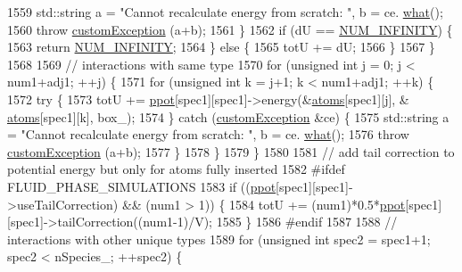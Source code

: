 \begin{DoxyCode}
1559                 std::string a = \textcolor{stringliteral}{"Cannot recalculate energy from scratch: "}, b = ce.
      \hyperlink{classcustom_exception_aeb6ab5848b038adfc68fde86a512f691}{what}();
1560                 \textcolor{keywordflow}{throw} \hyperlink{classcustom_exception}{customException} (a+b);
1561             \}
1562             \textcolor{keywordflow}{if} (dU == \hyperlink{potentials_8h_ab94ab1d09e2291d03fe92a0e24a9d33b}{NUM\_INFINITY}) \{
1563                 \textcolor{keywordflow}{return} \hyperlink{potentials_8h_ab94ab1d09e2291d03fe92a0e24a9d33b}{NUM\_INFINITY};
1564             \} \textcolor{keywordflow}{else} \{
1565                 totU += dU;
1566             \}
1567         \}
1568 
1569         \textcolor{comment}{// interactions with same type}
1570         \textcolor{keywordflow}{for} (\textcolor{keywordtype}{unsigned} \textcolor{keywordtype}{int} j = 0; j < num1+adj1; ++j) \{
1571             \textcolor{keywordflow}{for} (\textcolor{keywordtype}{unsigned} \textcolor{keywordtype}{int} k = j+1; k < num1+adj1; ++k) \{
1572                 \textcolor{keywordflow}{try} \{
1573                     totU += \hyperlink{classsim_system_ad2e290b5963f132e6a3a56cee35c8e9f}{ppot}[spec1][spec1]->energy(&\hyperlink{classsim_system_a90421b19082f7fb8fc23b7264b1161e4}{atoms}[spec1][j], &
      \hyperlink{classsim_system_a90421b19082f7fb8fc23b7264b1161e4}{atoms}[spec1][k], box\_);
1574                 \} \textcolor{keywordflow}{catch} (\hyperlink{classcustom_exception}{customException} &ce) \{
1575                     std::string a = \textcolor{stringliteral}{"Cannot recalculate energy from scratch: "}, b = ce.
      \hyperlink{classcustom_exception_aeb6ab5848b038adfc68fde86a512f691}{what}();
1576                     \textcolor{keywordflow}{throw} \hyperlink{classcustom_exception}{customException} (a+b);
1577                 \}
1578             \}
1579         \}
1580 
1581         \textcolor{comment}{// add tail correction to potential energy but only for atoms fully inserted}
1582 \textcolor{preprocessor}{#ifdef FLUID\_PHASE\_SIMULATIONS}
1583 \textcolor{preprocessor}{}        \textcolor{keywordflow}{if} ((\hyperlink{classsim_system_ad2e290b5963f132e6a3a56cee35c8e9f}{ppot}[spec1][spec1]->useTailCorrection) && (num1 > 1)) \{
1584             totU += (num1)*0.5*\hyperlink{classsim_system_ad2e290b5963f132e6a3a56cee35c8e9f}{ppot}[spec1][spec1]->tailCorrection((num1-1)/V);
1585         \}
1586 \textcolor{preprocessor}{#endif}
1587 \textcolor{preprocessor}{}
1588         \textcolor{comment}{// interactions with other unique types}
1589         \textcolor{keywordflow}{for} (\textcolor{keywordtype}{unsigned} \textcolor{keywordtype}{int} spec2 = spec1+1; spec2 < nSpecies\_; ++spec2) \{

\end{DoxyCode}
